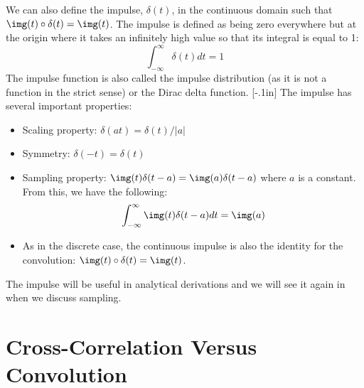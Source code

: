 We can also define the impulse, $\delta (t)$, in the continuous domain such that $\img(t) \circ \delta(t) = \img(t)$. The impulse is defined as being zero everywhere but at the origin where it takes an infinitely high value so that its integral is equal to 1:
\begin{equation}
\int_{-\infty}^{\infty} \delta(t) dt = 1
\end{equation}
The impulse function is also called the impulse distribution (as it is not a function in the strict sense) or the Dirac delta function. 
[-.1in]
The impulse has several important properties:
\begin{itemize}
\item Scaling property: $\delta (at) =  \delta (t) / |a|$
\item Symmetry: $\delta (-t) = \delta (t)$
\item Sampling property: $\img (t) \delta (t-a) = \img(a) \delta (t-a)$ where $a$ is a constant. From this, we have the following: 
\begin{equation}
\int_{-\infty}^{\infty} \img (t) \delta (t-a) dt = \img(a)
\end{equation}
\item As in the discrete case, the continuous impulse is also the identity for the convolution: $\img(t) \circ \delta (t) = \img(t)$.
\end{itemize}

The impulse will be useful in analytical derivations and we will see it again in \chap{\ref{chapter:sampling}} when we discuss sampling.

\section{Cross-Correlation Versus Convolution}

